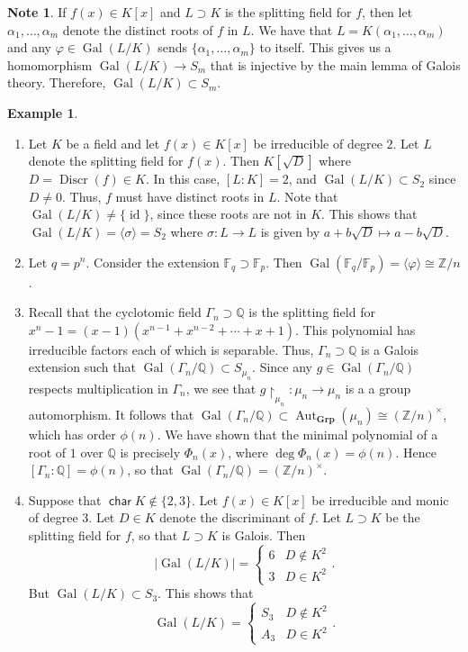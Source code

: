 \documentclass[10pt,letterpaper,cm]{nupset}
\theoremstyle{definition}
\newtheorem{exmp}[definition]{Example}
\newtheorem{note}[definition]{Note}
\theoremstyle{theorem}
\theoremstyle{remark}
\newcommand{\F}{\mathbb F}
\newcommand{\Q}{\mathbb Q}
\newcommand{\Z}{\mathbb Z}
\newcommand{\1}{\mathbf{1}}
\newcommand{\0}{\vec 0}
\DeclareMathOperator{\Char}{\mathsf{char}}
\DeclareMathOperator{\id}{id}
\DeclareMathOperator{\gal}{Gal}
\DeclareMathOperator{\aut}{Aut}
\DeclareMathOperator{\disc}{Discr}
\begin{document}
\begin{note}
If $f(x) \in K[x]$ and $L \supset K$ is the splitting field for $f$, then let $\alpha_1, \ldots, \alpha_m$ denote the distinct roots of $f$ in $L$. We have that $L = K(\alpha_1, \ldots, \alpha_m)$ and any $\varphi \in \gal(L/K) $ sends $\{\alpha_1, \ldots, \alpha_m\}$ to itself. This gives us a homomorphism $\gal(L/K) \to S_m$ that is injective by the main lemma of Galois theory. Therefore, $\gal(L/K) \subset S_m$.
\end{note}

\begin{exmp} $ $
\begin{enumerate}
\item Let $K$ be a field and let $f(x) \in K[x]$ be irreducible of degree $2$. Let $L$ denote the splitting field for $f(x)$. Then $K[\sqrt{D}]$ where $D = \disc(f) \in K$. In this case, $[L:K] = 2$, and $\gal(L/K) \subset S_2$ since $D \ne 0$. Thus, $f$ must have distinct roots in $L$. Note that $\gal(L/K) \ne \{\id\}$, since these roots are not in $K$. This shows that $\gal(L/K) = \langle \sigma \rangle = S_2$ where $\sigma : L \to L$ is given by $a + b \sqrt{D} \mapsto a-b \sqrt{D}$.
\item Let $q=p^n$. Consider the extension $\F_q \supset \F_p$. Then $\gal(\F_q/\F_p) = \langle \varphi \rangle \cong \Z/n$.
\item Recall that the cyclotomic field $\Gamma_n \supset \Q$ is the splitting field for $x^n-1 = (x-1)(x^{n-1} + x^{n-2} + \cdots + x + 1)$. This polynomial has irreducible factors each of which is separable. Thus, $\Gamma_n \supset \Q$ is a Galois extension such that $\gal(\Gamma_n / \Q) \subset S_{\mu_n}$. Since any $g \in \gal(\Gamma_n/\Q)$ respects multiplication in $\Gamma_n$, we see that $g \restriction_{\mu_n} : \mu_n \to \mu_n$ is a a group automorphism. It follows that $\gal(\Gamma_n / \Q) \subset \aut_{\mathbf{Grp}}(\mu_n) \cong (\Z/n)^{\times}$, which has order $\phi(n)$.   We have shown that the minimal polynomial of a root of $1$ over $\Q$ is precisely $\Phi_n(x)$, where $\deg{\Phi_n(x)} = \phi(n)$. Hence $[\Gamma_n : \Q]= \phi(n)$, so that $\gal(\Gamma_n / \Q) = (\Z/n)^{\times}$.
\item Suppose that $\Char{K} \notin \{2,3\}$. Let $f(x) \in K[x]$ be irreducible and monic of degree $3$. Let $D \in K$ denote the discriminant of $f$. Let $L \supset K$ be the splitting field for $f$, so that $L \supset K$ is Galois. Then $$\lvert{\gal(L/K)}\rvert = \begin{cases} 6 & D \notin K^2  \\ 3 & D \in K^2    \end{cases}.$$ But $\gal(L/K) \subset S_3$. This shows that $$\gal(L/K) = \begin{cases} S_3 & D \notin K^2  \\ A_3 & D \in K^2    \end{cases}.$$
\end{enumerate}
\end{exmp}
\end{document}
